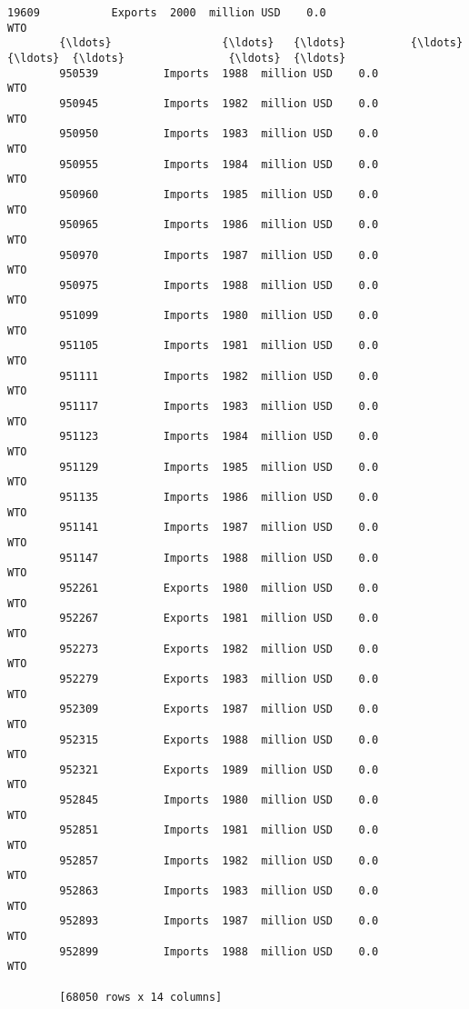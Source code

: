 \documentclass[11pt]{article}
\begin{document}
\begin{Verbatim}[commandchars=\\\{\}]
        19609           Exports  2000  million USD    0.0                     WTO       
        {\ldots}                 {\ldots}   {\ldots}          {\ldots}    {\ldots}  {\ldots}                {\ldots}  {\ldots}  
        950539          Imports  1988  million USD    0.0                     WTO       
        950945          Imports  1982  million USD    0.0                     WTO       
        950950          Imports  1983  million USD    0.0                     WTO       
        950955          Imports  1984  million USD    0.0                     WTO       
        950960          Imports  1985  million USD    0.0                     WTO       
        950965          Imports  1986  million USD    0.0                     WTO       
        950970          Imports  1987  million USD    0.0                     WTO       
        950975          Imports  1988  million USD    0.0                     WTO       
        951099          Imports  1980  million USD    0.0                     WTO       
        951105          Imports  1981  million USD    0.0                     WTO       
        951111          Imports  1982  million USD    0.0                     WTO       
        951117          Imports  1983  million USD    0.0                     WTO       
        951123          Imports  1984  million USD    0.0                     WTO       
        951129          Imports  1985  million USD    0.0                     WTO       
        951135          Imports  1986  million USD    0.0                     WTO       
        951141          Imports  1987  million USD    0.0                     WTO       
        951147          Imports  1988  million USD    0.0                     WTO       
        952261          Exports  1980  million USD    0.0                     WTO       
        952267          Exports  1981  million USD    0.0                     WTO       
        952273          Exports  1982  million USD    0.0                     WTO       
        952279          Exports  1983  million USD    0.0                     WTO       
        952309          Exports  1987  million USD    0.0                     WTO       
        952315          Exports  1988  million USD    0.0                     WTO       
        952321          Exports  1989  million USD    0.0                     WTO       
        952845          Imports  1980  million USD    0.0                     WTO       
        952851          Imports  1981  million USD    0.0                     WTO       
        952857          Imports  1982  million USD    0.0                     WTO       
        952863          Imports  1983  million USD    0.0                     WTO       
        952893          Imports  1987  million USD    0.0                     WTO       
        952899          Imports  1988  million USD    0.0                     WTO       
        
        [68050 rows x 14 columns]
\end{Verbatim}
            
\end{document}
